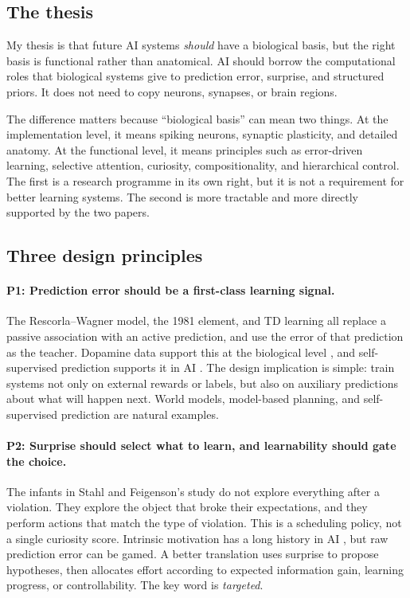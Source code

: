 \documentclass{article}
\begin{document}
\subsection{The thesis}

My thesis is that future AI systems \emph{should} have a biological basis, but the right
basis is functional rather than anatomical. AI should borrow the computational roles that
biological systems give to prediction error, surprise, and structured priors. It does not
need to copy neurons, synapses, or brain regions.

The difference matters because ``biological basis'' can mean two things. At the
implementation level, it means spiking neurons, synaptic plasticity, and detailed anatomy.
At the functional level, it means principles such as error-driven learning, selective
attention, curiosity, compositionality, and hierarchical control. The first is a research
programme in its own right, but it is not a requirement for better learning systems. The
second is more tractable and more directly supported by the two papers.

\subsection{Three design principles}

\paragraph{P1: Prediction error should be a first-class learning signal.}
The Rescorla--Wagner model, the 1981 element, and TD learning all replace a passive
association with an active prediction, and use the error of that prediction as the teacher.
Dopamine data support this at the biological level \citep{schultz1997neural}, and
self-supervised prediction supports it in AI \citep{pathak2017curiosity}. The design
implication is simple: train systems not only on external rewards or labels, but also on
auxiliary predictions about what will happen next. World models, model-based planning, and
self-supervised prediction are natural examples.

\paragraph{P2: Surprise should select what to learn, and learnability should gate the choice.}
The infants in Stahl and Feigenson's study do not explore everything after a violation.
They explore the object that broke their expectations, and they perform actions that match
the type of violation. This is a scheduling policy, not a single curiosity score.
Intrinsic motivation has a long history in AI \citep{schmidhuber2010formal}, but raw
prediction error can be gamed. A better translation uses surprise to propose hypotheses,
then allocates effort according to expected information gain, learning progress, or
controllability. The key word is \emph{targeted}.
\end{document}
